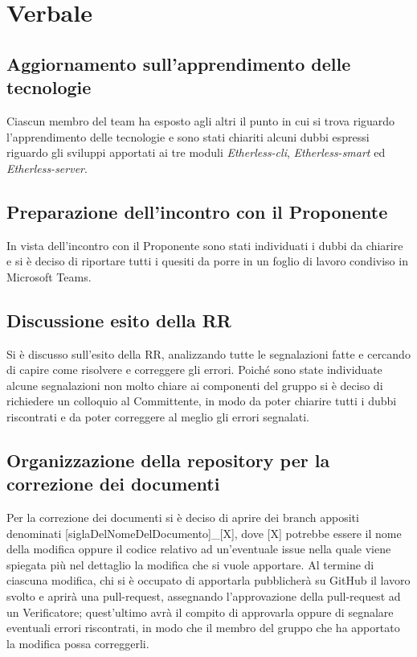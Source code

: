\section{Verbale}

	\subsection{Aggiornamento sull'apprendimento delle tecnologie}
		Ciascun membro del team ha esposto agli altri il punto in cui si trova riguardo l'apprendimento delle tecnologie e sono stati chiariti alcuni dubbi espressi riguardo gli sviluppi apportati ai tre moduli \textit{Etherless-cli}, \textit{Etherless-smart} ed \textit{Etherless-server}.
		
	\subsection{Preparazione dell'incontro con il Proponente}
		In vista dell'incontro con il Proponente sono stati individuati i dubbi da chiarire e si è deciso di riportare tutti i quesiti da porre in un foglio di lavoro condiviso in Microsoft Teams.
		
	\subsection{Discussione esito della RR} 
		Si è discusso sull'esito della RR, analizzando tutte le segnalazioni fatte e cercando di capire come risolvere e correggere gli errori.
		Poiché sono state individuate alcune segnalazioni non molto chiare ai componenti del gruppo si è deciso di richiedere un colloquio al Committente, in modo da poter chiarire tutti i dubbi riscontrati e da poter correggere al meglio gli errori segnalati.
	
	\subsection{Organizzazione della repository per la correzione dei documenti}
		Per la correzione dei documenti si è deciso di aprire dei branch appositi denominati [siglaDelNomeDelDocumento]\_[X], dove [X] potrebbe essere il nome della modifica oppure il codice relativo ad un'eventuale issue nella quale viene spiegata più nel dettaglio la modifica che si vuole apportare.
		Al termine di ciascuna modifica, chi si è occupato di apportarla pubblicherà su GitHub il lavoro svolto e aprirà una pull-request, assegnando l'approvazione della pull-request ad un Verificatore; quest'ultimo avrà il compito di approvarla oppure di segnalare eventuali errori riscontrati, in modo che il membro del gruppo che ha apportato la modifica possa correggerli.
	
